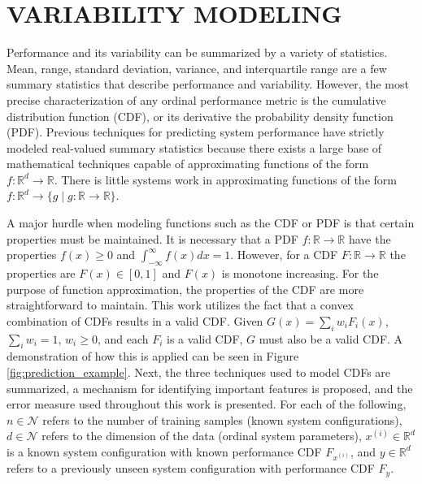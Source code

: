 \documentclass[letterpaper, 10 pt, conference]{ieeeconf}  %
\begin{document}
\section{VARIABILITY MODELING}
\label{sec:variability_modeling}

Performance and its variability can be summarized by a variety of statistics. Mean, range, standard deviation, variance, and interquartile range are a few summary statistics that describe performance and variability. However, the most precise characterization of any ordinal performance metric is the cumulative distribution function (CDF), or its derivative the probability density function (PDF). Previous techniques for predicting system performance have strictly modeled real-valued summary statistics because there exists a large base of mathematical techniques capable of approximating functions of the form $f: \mathbb{R}^d \rightarrow \mathbb{R}$. There is little systems work in approximating functions of the form $f: \mathbb{R}^d \rightarrow \{g \mid g: \mathbb{R} \rightarrow \mathbb{R}\}$.

A major hurdle when modeling functions such as the CDF or PDF is that certain properties must be maintained. It is necessary that a PDF $f: \mathbb{R} \rightarrow \mathbb{R}$ have the properties $f(x) \geq 0$ and $\int_{-\infty}^{\infty}f(x)dx = 1$. However, for a CDF $F: \mathbb{R} \rightarrow \mathbb{R}$ the properties are $F(x) \in [0,1]$ and $F(x)$ is monotone increasing. For the purpose of function approximation, the properties of the CDF are more straightforward to maintain. This work utilizes the fact that a convex combination of CDFs results in a valid CDF. Given $G(x) = \sum_{i}w_i F_i(x)$, $\sum_{i} w_i = 1$, $w_i \geq 0$, and each $F_i$ is a valid CDF, $G$ must also be a valid CDF. A demonstration of how this is applied can be seen in Figure \ref{fig:prediction_example}. Next, the three techniques used to model CDFs are summarized, a mechanism for identifying important features is proposed, and the error measure used throughout this work is presented. For each of the following, $n \in \mathcal{N}$ refers to the number of training samples (known system configurations), $d \in \mathcal{N}$ refers to the dimension of the data (ordinal system parameters), $x^{(i)} \in \mathbb{R}^d$ is a known system configuration with known performance CDF $F_{x^{(i)}}$, and $y \in \mathbb{R}^d$ refers to a previously unseen system configuration with performance CDF $F_y$.
\end{document}
